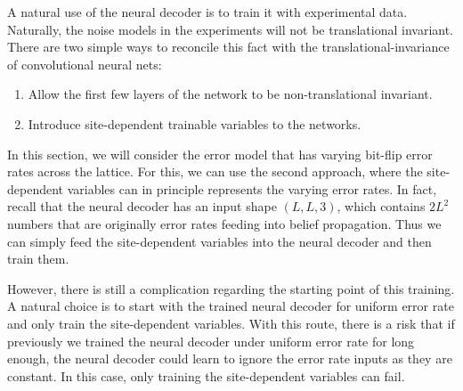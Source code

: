 A natural use of the neural decoder is to train it with experimental data.
Naturally, the noise models in the experiments will not be translational invariant.
There are two simple ways to reconcile this fact with the translational-invariance of convolutional neural nets:
\begin{enumerate}
	\item Allow the first few layers of the network to be non-translational invariant.
	\item Introduce site-dependent trainable variables to the networks.
\end{enumerate}
In this section, we will consider the error model that has varying bit-flip error rates across the lattice.
For this, we can use the second approach, where the site-dependent variables can in principle represents the varying error rates.
In fact, recall that the neural decoder has an input shape $(L,L,3)$, which contains $2L^2$ numbers that are originally error rates feeding into belief propagation.
Thus we can simply feed the site-dependent variables into the neural decoder and then train them.

However, there is still a complication regarding the starting point of this training.
A natural choice is to start with the trained neural decoder for uniform error rate and only train the site-dependent variables.
With this route, there is a risk that if previously we trained the neural decoder under uniform error rate for long enough, the neural decoder could learn to ignore the error rate inputs as they are constant.
In this case, only training the site-dependent variables can fail.

